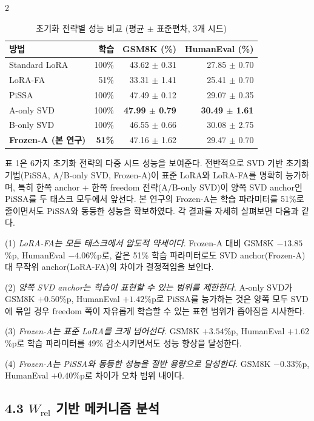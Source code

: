 \documentclass[a4paper,10pt]{article}
\begin{document}
\begin{multicols}{2}
\begin{table}[H]
\centering
\caption{초기화 전략별 성능 비교 (평균 $\pm$ 표준편차, 3개 시드)}
\small
\begin{tabular}{lrrr}
\toprule
방법 & 학습 & GSM8K (\%) & HumanEval (\%) \\
\midrule
Standard LoRA   & 100\% & 43.62 $\pm$ 0.31 & 27.85 $\pm$ 0.70 \\
LoRA-FA         & 51\%  & 33.31 $\pm$ 1.41 & 25.41 $\pm$ 0.70 \\
PiSSA           & 100\% & 47.49 $\pm$ 0.12 & 29.07 $\pm$ 0.35 \\
A-only SVD      & 100\% & \textbf{47.99 $\pm$ 0.79} & \textbf{30.49 $\pm$ 1.61} \\
B-only SVD      & 100\% & 46.55 $\pm$ 0.66 & 30.08 $\pm$ 2.75 \\
\textbf{Frozen-A (본 연구)} & \textbf{51\%}  & 47.16 $\pm$ 1.62 & 29.47 $\pm$ 0.70 \\
\bottomrule
\end{tabular}
\end{table}

표 1은 6가지 초기화 전략의 다중 시드 성능을 보여준다. 전반적으로 SVD 기반 초기화 기법(PiSSA, A/B-only SVD, Frozen-A)이 표준 LoRA와 LoRA-FA를 명확히 능가하며, 특히 한쪽 anchor + 한쪽 freedom 전략(A/B-only SVD)이 양쪽 SVD anchor인 PiSSA를 두 태스크 모두에서 앞선다. 본 연구의 Frozen-A는 학습 파라미터를 51\%로 줄이면서도 PiSSA와 동등한 성능을 확보하였다. 각 결과를 자세히 살펴보면 다음과 같다.

(1) \textit{LoRA-FA는 모든 태스크에서 압도적 약세이다}. Frozen-A 대비 GSM8K $-13.85$\%p, HumanEval $-4.06$\%p로, 같은 51\% 학습 파라미터로도 SVD anchor(Frozen-A) 대 무작위 anchor(LoRA-FA)의 차이가 결정적임을 보인다.

(2) \textit{양쪽 SVD anchor는 학습이 표현할 수 있는 범위를 제한한다}. A-only SVD가 GSM8K $+0.50$\%p, HumanEval $+1.42$\%p로 PiSSA를 능가하는 것은 양쪽 모두 SVD에 묶일 경우 freedom 쪽이 자유롭게 학습할 수 있는 표현 범위가 좁아짐을 시사한다.

(3) \textit{Frozen-A는 표준 LoRA를 크게 넘어선다}. GSM8K $+3.54$\%p, HumanEval $+1.62$\%p로 학습 파라미터를 49\% 감소시키면서도 성능 향상을 달성한다.

(4) \textit{Frozen-A는 PiSSA와 동등한 성능을 절반 용량으로 달성한다}. GSM8K $-0.33$\%p, HumanEval $+0.40$\%p로 차이가 오차 범위 내이다.

\subsection*{4.3 $W_{\text{rel}}$ 기반 메커니즘 분석}


\end{multicols}
\end{document}

